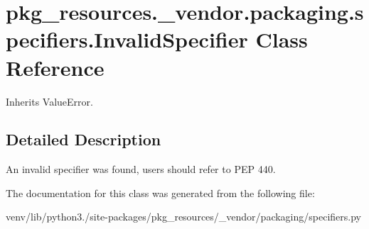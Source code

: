 \hypertarget{classpkg__resources_1_1__vendor_1_1packaging_1_1specifiers_1_1_invalid_specifier}{}\section{pkg\+\_\+resources.\+\_\+vendor.\+packaging.\+specifiers.\+Invalid\+Specifier Class Reference}
\label{classpkg__resources_1_1__vendor_1_1packaging_1_1specifiers_1_1_invalid_specifier}


Inherits Value\+Error.



\subsection{Detailed Description}
\begin{DoxyVerb}An invalid specifier was found, users should refer to PEP 440.
\end{DoxyVerb}
 

The documentation for this class was generated from the following file\+:\begin{DoxyCompactItemize}
\item 
venv/lib/python3./site-\/packages/pkg\+\_\+resources/\+\_\+vendor/packaging/specifiers.\+py\end{DoxyCompactItemize}
